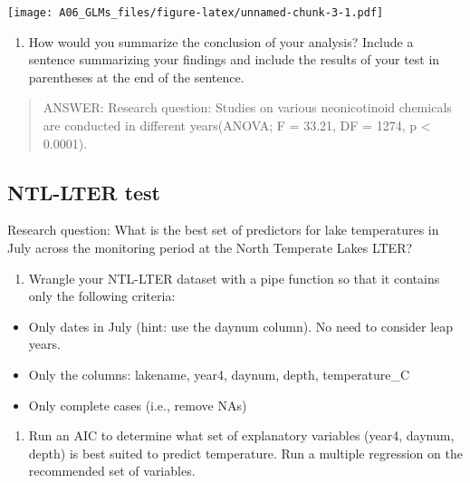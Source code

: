 \documentclass[]{article}
\providecommand{\tightlist}{%
  \setlength{\itemsep}{0pt}\setlength{\parskip}{0pt}}
\begin{document}
\texttt{[image: A06\_GLMs\_files/figure-latex/unnamed-chunk-3-1.pdf]}

\begin{enumerate}
\def\labelenumi{\arabic{enumi}.}
\setcounter{enumi}{8}
\tightlist
\item
  How would you summarize the conclusion of your analysis? Include a
  sentence summarizing your findings and include the results of your
  test in parentheses at the end of the sentence.
\end{enumerate}

\begin{quote}
ANSWER: Research question: Studies on various neonicotinoid chemicals
are conducted in different years(ANOVA; F = 33.21, DF = 1274, p
\textless{} 0.0001).
\end{quote}

\subsection{NTL-LTER test}\label{ntl-lter-test}

Research question: What is the best set of predictors for lake
temperatures in July across the monitoring period at the North Temperate
Lakes LTER?

\begin{enumerate}
\def\labelenumi{\arabic{enumi}.}
\setcounter{enumi}{10}
\tightlist
\item
  Wrangle your NTL-LTER dataset with a pipe function so that it contains
  only the following criteria:
\end{enumerate}

\begin{itemize}
\tightlist
\item
  Only dates in July (hint: use the daynum column). No need to consider
  leap years.
\item
  Only the columns: lakename, year4, daynum, depth, temperature\_C
\item
  Only complete cases (i.e., remove NAs)
\end{itemize}

\begin{enumerate}
\def\labelenumi{\arabic{enumi}.}
\setcounter{enumi}{11}
\tightlist
\item
  Run an AIC to determine what set of explanatory variables (year4,
  daynum, depth) is best suited to predict temperature. Run a multiple
  regression on the recommended set of variables.
\end{enumerate}
\end{document}
